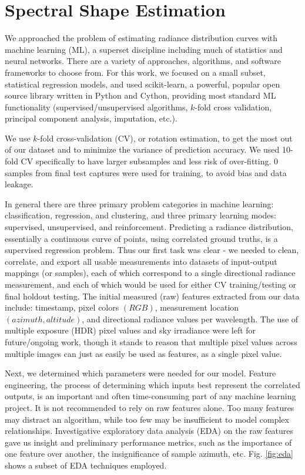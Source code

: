 \section{Spectral Shape Estimation}
\label{sec:methods}

We approached the problem of estimating radiance distribution curves with machine learning (ML), a superset discipline including much of statistics and neural networks. There are a variety of approaches, algorithms, and software frameworks to choose from. For this work, we focused on a small subset, statistical regression models, and used scikit-learn\cite{pedregosa_scikit}, a powerful, popular open source library written in Python and Cython,\cite{behnel_cython} providing most standard ML functionality (supervised/unsupervised algorithms, $k$-fold cross validation, principal component analysis, imputation, etc.).

We use $k$-fold cross-validation (CV), or rotation estimation,\cite{picard_cv,kohavi_cvstudy} to get the most out of our dataset and to minimize the variance of prediction accuracy. We used 10-fold CV specifically to have larger subsamples and less risk of over-fitting. 0 samples from final test captures were used for training, to avoid bias and data leakage.\cite{cawley_overfitting}

In general there are three primary problem categories in machine learning: classification, regression, and clustering, and three primary learning modes: supervised, unsupervised, and reinforcement. Predicting a radiance distribution, essentially a continuous curve of points, using correlated ground truths, is a supervised regression problem. Thus our first task was clear -  we needed to clean, correlate, and export all usable measurements into datasets of input-output mappings (or samples), each of which correspond to a single directional radiance measurement, and each of which would be used for either CV training/testing or final holdout testing. The initial measured (raw) features extracted from our data include: timestamp, pixel colors $(RGB)$, measurement location $(azimuth, altitude)$, and directional radiance values per wavelength. The use of multiple exposure (HDR) pixel values and sky irradiance were left for future/ongoing work, though it stands to reason that multiple pixel values across multiple images can just as easily be used as features, as a single pixel value.

Next, we determined which parameters were needed for our model. Feature engineering, the process of determining which inputs best represent the correlated outputs, is an important and often time-consuming part of any machine learning project.\cite{mitchell_ml, domingos_feature, forman_feature, brownlee_mlmastery} It is not recommended to rely on raw features alone. Too many features may distract an algorithm, while too few may be insufficient to model complex relationships. Investigative exploratory data analysis (EDA) on the raw features gave us insight and preliminary performance metrics, such as the importance of one feature over another, the insignificance of sample azimuth, etc. Fig. \ref{fig:eda} shows a subset of EDA techniques employed.

